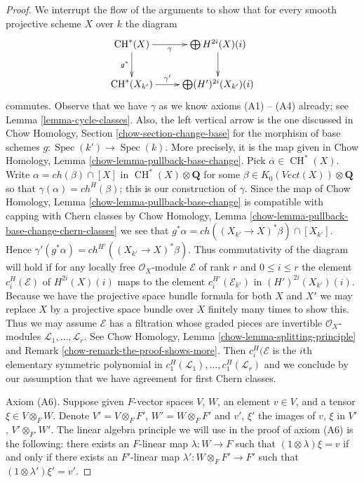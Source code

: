 \documentclass[10pt,a4paper]{amsart}
\theoremstyle{plain}
\theoremstyle{definition}
\theoremstyle{remark}
\numberwithin{equation}{subsection}
\def\Spec{\mathop{\mathrm{Spec}}}
\def\CH{\mathop{\mathrm{CH}}\nolimits}
\begin{document}
\begin{proof}
\medskip\noindent
We interrupt the flow of the arguments to show that for every
smooth projective scheme $X$ over $k$ the diagram
$$
\xymatrix{
\CH^*(X) \ar[r]_-\gamma \ar[d]_{g^*} & \bigoplus H^{2i}(X)(i) \ar[d] \\
\CH^*(X_{k'}) \ar[r]^-{\gamma'} & \bigoplus (H')^{2i}(X_{k'})(i)
}
$$
commutes. Observe that we have $\gamma$ as we know axioms
(A1) -- (A4) already; see Lemma \ref{lemma-cycle-classes}.
Also, the left vertical arrow is the one discussed in
Chow Homology, Section \ref{chow-section-change-base}
for the morphism of base schemes $g : \Spec(k') \to \Spec(k)$.
More precisely, it is the map given in
Chow Homology, Lemma \ref{chow-lemma-pullback-base-change}.
Pick $\alpha \in \CH^*(X)$. Write $\alpha = ch(\beta) \cap [X]$
in $\CH^*(X) \otimes \mathbf{Q}$
for some $\beta \in K_0(\textit{Vect}(X)) \otimes \mathbf{Q}$
so that $\gamma(\alpha) = ch^{H}(\beta)$; this is our construction of $\gamma$.
Since the map of Chow Homology, Lemma \ref{chow-lemma-pullback-base-change}
is compatible with capping with Chern classes by
Chow Homology, Lemma \ref{chow-lemma-pullback-base-change-chern-classes}
we see that $g^*\alpha = ch((X_{k'} \to X)^*\beta) \cap [X_{k'}]$.
Hence $\gamma'(g^*\alpha) = ch^{H'}((X_{k'} \to X)^*\beta)$.
Thus commutativity of the diagram will hold if for any locally
free $\mathcal{O}_X$-module $\mathcal{E}$ of rank $r$ and $0 \leq i \leq r$
the element $c_i^H(\mathcal{E})$ of $H^{2i}(X)(i)$
maps to the element $c_i^{H'}(\mathcal{E}_{k'})$ in $(H')^{2i}(X_{k'})(i)$.
Because we have the projective space bundle formula for both
$X$ and $X'$ we may replace $X$ by a projective space bundle
over $X$ finitely many times to show this. Thus we may assume
$\mathcal{E}$ has a filtration whose graded pieces are
invertible $\mathcal{O}_X$-modules
$\mathcal{L}_1, \ldots, \mathcal{L}_r$.
See Chow Homology, Lemma \ref{chow-lemma-splitting-principle} and
Remark \ref{chow-remark-the-proof-shows-more}.
Then $c^H_i(\mathcal{E}$ is the $i$th elementary symmetric polynomial
in $c^H_1(\mathcal{L}_1), \ldots, c^H_1(\mathcal{L}_r)$
and we conclude by our assumption that we have agreement for
first Chern classes.

\medskip\noindent
Axiom (A6). Suppose given $F$-vector spaces
$V$, $W$, an element $v \in V$, and a tensor $\xi \in V \otimes_F W$.
Denote $V' = V \otimes_F F'$, $W' = W \otimes_F F'$ and $v'$, $\xi'$
the images of $v$, $\xi$ in $V'$, $V' \otimes_{F'} W'$. The linear algebra
principle we will use in the proof of axiom (A6) is the following:
there exists an $F$-linear map $\lambda : W \to F$ such that
$(1 \otimes \lambda)\xi = v$ if and only if there exists an $F'$-linear
map $\lambda' : W \otimes_F F' \to F'$ such that
$(1 \otimes \lambda')\xi' = v'$.


\end{proof}
\end{document}

